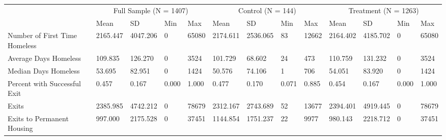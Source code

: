 \begin{tabular}{lllllllllllll}
\toprule
 & \multicolumn{4}{c}{Full Sample (N = 1407)} & \multicolumn{4}{c}{Control (N = 144)} & \multicolumn{4}{c}{Treatment (N = 1263)} \\
 & Mean & SD & Min & Max & Mean & SD & Min & Max & Mean & SD & Min & Max \\
\midrule
Number of First Time Homeless & 2165.447 & 4047.206 & 0 & 65080 & 2174.611 & 2536.065 & 83 & 12662 & 2164.402 & 4185.702 & 0 & 65080 \\
Average Days Homeless & 109.835 & 126.270 & 0 & 3524 & 101.729 & 68.602 & 24 & 473 & 110.759 & 131.232 & 0 & 3524 \\
Median Days Homeless & 53.695 & 82.951 & 0 & 1424 & 50.576 & 74.106 & 1 & 706 & 54.051 & 83.920 & 0 & 1424 \\
Percent with Successful Exit & 0.457 & 0.167 & 0.000 & 1.000 & 0.477 & 0.170 & 0.071 & 0.885 & 0.454 & 0.167 & 0.000 & 1.000 \\
Exits & 2385.985 & 4742.212 & 0 & 78679 & 2312.167 & 2743.689 & 52 & 13677 & 2394.401 & 4919.445 & 0 & 78679 \\
Exits to Permanent Housing & 997.000 & 2175.528 & 0 & 37451 & 1144.854 & 1751.237 & 22 & 9977 & 980.143 & 2218.712 & 0 & 37451 \\
\bottomrule
\end{tabular}
